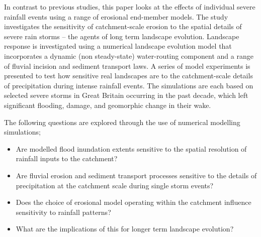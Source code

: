 
In contrast to previous studies, this paper looks at the effects of individual severe rainfall events using a range of erosional end-member models. The study investigates the sensitivity of catchment-scale erosion to the spatial details of severe rain storms -- the agents of long term landscape evolution. Landscape response is investigated using a numerical landscape evolution model that incorporates a dynamic (non steady-state) water-routing component and a range of fluvial incision and sediment transport laws. A series of model experiments is presented to test how sensitive real landscapes are to the catchment-scale details of precipitation during intense rainfall events. The simulations are each based on selected severe storms in Great Britain occurring in the past decade, which left significant flooding, damage, and geomorphic change in their wake.

The following questions are explored through the use of numerical modelling simulations;

\begin{itemize}
\item Are modelled flood inundation extents sensitive to the spatial resolution of rainfall inputs to the catchment?
\item Are fluvial erosion and sediment transport processes sensitive to the details of precipitation at the catchment scale during single storm events?
\item Does the choice of erosional model operating within the catchment influence sensitivity to rainfall patterns? 
\item What are the implications of this for longer term landscape evolution? 
\end{itemize}

